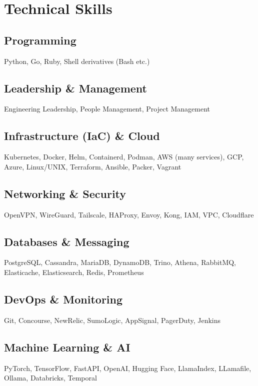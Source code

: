\documentclass[]{resume}
\begin{document}
\begin{minipage}[t]{0.33\textwidth}


\section{Technical Skills}
\subsection{Programming}
Python, Go, Ruby, Shell derivatives (Bash etc.)
\sectionsep

\subsection{Leadership \& Management}
Engineering Leadership, People Management, Project Management
\sectionsep

\subsection{Infrastructure (IaC) \& Cloud}
Kubernetes, Docker, Helm, Containerd, Podman, AWS (many services), GCP, Azure, Linux/UNIX, Terraform, Ansible, Packer, Vagrant
\sectionsep

\subsection{Networking \& Security}
OpenVPN, WireGuard, Tailscale, HAProxy, Envoy, Kong, IAM, VPC, Cloudflare
\sectionsep

\subsection{Databases \& Messaging}
PostgreSQL, Cassandra, MariaDB, DynamoDB, Trino, Athena, RabbitMQ, Elasticache, Elasticsearch, Redis, Prometheus
\sectionsep

\subsection{DevOps \& Monitoring}
Git, Concourse, NewRelic, SumoLogic, AppSignal, PagerDuty, Jenkins
\sectionsep

\subsection{Machine Learning \& AI}
PyTorch, TensorFlow, FastAPI, OpenAI, Hugging Face, LlamaIndex, LLamafile, Ollama, Databricks, Temporal
\sectionsep


\end{minipage}
\end{document}
